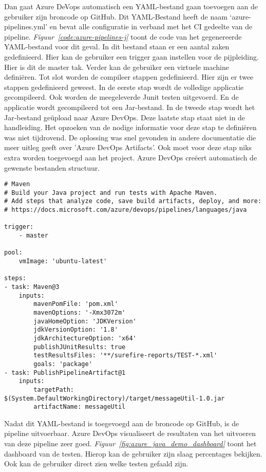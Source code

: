 Dan gaat Azure DeVops automatisch een YAML-bestand gaan toevoegen aan de gebruiker zijn broncode op GitHub. Dit YAML-Bestand heeft de naam ‘azure-pipelines.yml’ en bevat alle configuratie in verband met het CI gedeelte van de pipeline. \emph{Figuur~\ref{code:azure-pipelines-j}} toont de code van het gegenereerde YAML-bestand voor dit geval. In dit bestand staan er een aantal zaken gedefinieerd. Hier kan de gebruiker een trigger gaan instellen voor de pijpleiding. Hier is dit de master tak. Verder kan de gebruiker een virtuele machine definiëren. Tot slot worden de compileer stappen gedefinieerd. Hier zijn er twee stappen gedefinieerd geweest. In de eerste stap wordt de volledige applicatie gecompileerd. Ook worden de meegeleverde Junit testen uitgevoerd. En de applicatie wordt gecompileerd tot een Jar-bestand. In de tweede stap wordt het Jar-bestand geüpload naar Azure DevOps. Deze laatste stap staat niet in de handleiding. Het opzoeken van de nodige informatie voor deze stap te definiëren was niet tijdrovend. De oplossing was snel gevonden in andere documentatie die meer uitleg geeft over 'Azure DevOps Artifacts'. Ook moet voor deze stap niks extra worden toegevoegd aan het project. Azure DevOps creëert automatisch de gewenste bestanden structuur.

\begin{lstlisting}
# Maven
# Build your Java project and run tests with Apache Maven.
# Add steps that analyze code, save build artifacts, deploy, and more:
# https://docs.microsoft.com/azure/devops/pipelines/languages/java

trigger:
    - master

pool:
    vmImage: 'ubuntu-latest'

steps:
- task: Maven@3
    inputs:
        mavenPomFile: 'pom.xml'
        mavenOptions: '-Xmx3072m'
        javaHomeOption: 'JDKVersion'
        jdkVersionOption: '1.8'
        jdkArchitectureOption: 'x64'
        publishJUnitResults: true
        testResultsFiles: '**/surefire-reports/TEST-*.xml'
        goals: 'package'
- task: PublishPipelineArtifact@1
    inputs:
        targetPath: $(System.DefaultWorkingDirectory)/target/messageUtil-1.0.jar
        artifactName: messageUtil
\end{lstlisting}

Nadat dit YAML-bestand is toegevoegd aan de broncode op GitHub, is de pipeline uitvoerbaar. Azure DevOps visualiseert de resultaten van het uitvoeren van deze pipeline zeer goed. \emph{Figuur~\ref{fig:azure_java_demo_dashboard}} toont het dashboard van de testen. Hierop kan de gebruiker zijn slaag percentages bekijken. Ook kan de gebruiker direct zien welke testen gefaald zijn.

